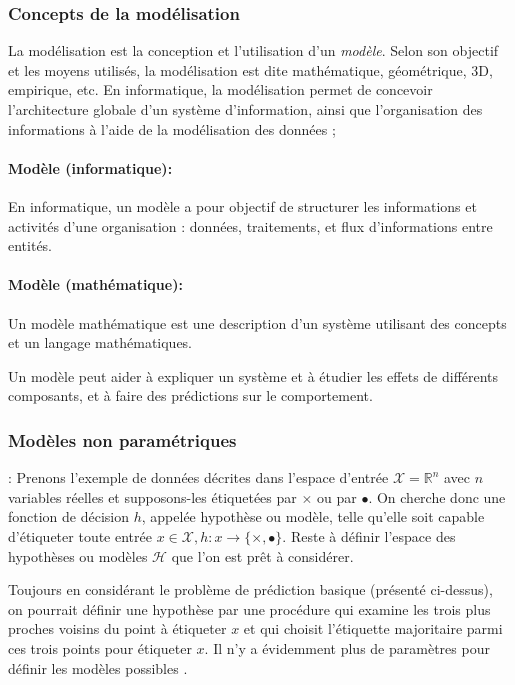 	
	\subsubsection{Concepts de la modélisation}\label{sec:modelisation}
	La modélisation est la conception et l'utilisation d'un \textit{modèle}. Selon son objectif et les moyens utilisés, la modélisation est dite mathématique, géométrique, 3D, empirique, etc. 
	En informatique, la modélisation permet de concevoir l'architecture globale d'un système d'information, ainsi que l'organisation des informations à l'aide de la modélisation des données ;
	
	\paragraph*{Modèle (informatique):} En informatique, un modèle a pour objectif de structurer les informations et activités d'une organisation : données, traitements, et flux d'informations entre entités.
	
	\paragraph*{Modèle (mathématique):} Un modèle mathématique est une description d'un système utilisant des concepts et un langage mathématiques.
	
	Un modèle peut aider à expliquer un système et à étudier les effets de différents composants, et à faire des prédictions sur le comportement.
	
	\subsubsection*{Modèles non paramétriques}
	
	
	\Eg: Prenons l'exemple de données décrites dans l'espace d'entrée $\mathcal{X} = \mathbb{R}^n$ avec $n$ variables réelles et supposons-les étiquetées par $\times$ ou par $\bullet$. On cherche donc une fonction de décision $h$, appelée hypothèse ou modèle, telle qu'elle soit capable d'étiqueter toute entrée 
	$x \in \mathcal{X}, h: x \rightarrow \{\times,\bullet\}$. Reste à définir l'espace des hypothèses ou modèles $\mathcal{H}$ que l'on est prêt à considérer.
	
	Toujours en considérant le problème de prédiction basique (présenté ci-dessus), on pourrait définir une hypothèse par une procédure qui examine les trois plus proches voisins du point à étiqueter $x$ et qui choisit l'étiquette majoritaire parmi ces trois points pour étiqueter $x$. Il n'y a évidemment plus de paramètres pour définir les modèles possibles \cite{antoine2018apprentissage}.
	
